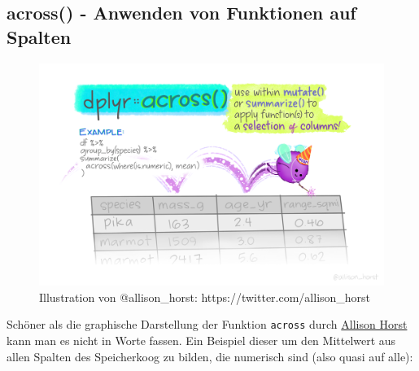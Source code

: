 \documentclass[
]{article}
\begin{document}
\hypertarget{across---anwenden-von-funktionen-auf-spalten}{%
\subsection{across() - Anwenden von Funktionen auf Spalten}\label{across---anwenden-von-funktionen-auf-spalten}}

\begin{figure}

{\centering \includegraphics[width=1\linewidth]{images/043} 

}

\caption{Illustration von @allison_horst: https://twitter.com/allison_horst}\label{fig:unnamed-chunk-149}
\end{figure}

Schöner als die graphische Darstellung der Funktion \texttt{across} durch \href{https://twitter.com/allison_horst?lang=de}{Allison Horst} kann man es nicht in Worte fassen. Ein Beispiel dieser um den Mittelwert aus allen Spalten des Speicherkoog zu bilden, die numerisch sind (also quasi auf alle):
\end{document}
